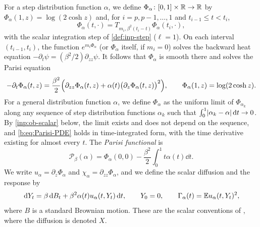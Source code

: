 For a step distribution function $\alpha$, we define
$\Phi_\alpha\colon[0,1]\times\mathbb R\to\mathbb R$ by $\Phi_\alpha(1,z)=\log(2\cosh z)$ and,
for $i=p,p-1,\dots,1$ and $t_{i-1}\le t<t_i$,
\begin{equation}\label{eq:inp-scalar-recursion}
 \Phi_\alpha(t,\cdot)=T_{m_i,\beta^2(t_i-t)}\Phi_\alpha(t_i,\cdot),
\end{equation}
with the scalar integration step of \cref{def:inp-step} ($\ell=1$). On each
interval $(t_{i-1},t_i)$, the function $e^{m_i\Phi_\alpha}$ (or $\Phi_\alpha$
itself, if $m_i=0$) solves the backward heat equation
$-\partial_t\psi=(\beta^2/2)\partial_{zz}\psi$. It follows that $\Phi_\alpha$ is
smooth there and solves the Parisi equation
\begin{equation}\label{b:eq:Parisi-PDE}
 -\partial_t\Phi_\alpha(t,z)=\frac{\beta^2}{2}
 \Bigl(\partial_{zz}\Phi_\alpha(t,z)+\alpha(t)\bigl(\partial_z\Phi_\alpha(t,z)\bigr)^2\Bigr),
 \qquad \Phi_\alpha(1,z)=\log(2\cosh z).
\end{equation}
For a general distribution function $\alpha$, we define $\Phi_\alpha$ as the
uniform limit of $\Phi_{\alpha_k}$ along any sequence of step distribution
functions $\alpha_k$ such that $\int_0^1\lvert \alpha_k-\alpha\rvert\,\mathrm d t\to0$. By
\cref{inp:ob-scalar} below, the limit exists and does not depend on the
sequence, and \eqref{b:eq:Parisi-PDE} holds in time-integrated form, with the
time derivative existing for almost every $t$. The \emph{Parisi functional} is
\begin{equation}\label{b:eq:Parisi-functional}
 \mathcal P_\beta(\alpha)=\Phi_\alpha(0,0)-\frac{\beta^2}{2}\int_0^1t\alpha(t)\dd t.
\end{equation}
We write $u_\alpha=\partial_z\Phi_\alpha$ and $\chi_\alpha=\partial_{zz}\Phi_\alpha$,
and we define the scalar diffusion and the response by
\begin{equation}\label{b:eq:scalar-diffusion}
 \,\mathrm d Y_t=\beta\,\mathrm d B_t+\beta^2\alpha(t)u_\alpha(t,Y_t)\,\mathrm d t,\qquad Y_0=0,\qquad
 \Gamma_\alpha(t)=\mathbb E u_\alpha(t,Y_t)^2,
\end{equation}
where $B$ is a standard Brownian motion. These are the scalar conventions of
\cite[Section~3]{oai-barriers}, where the diffusion is denoted $X$.


